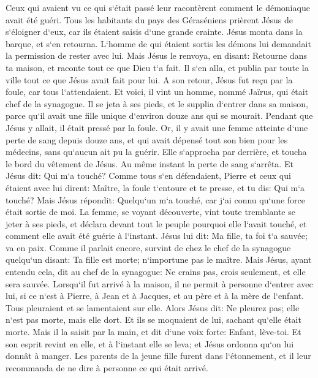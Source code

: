 \verse Ceux qui avaient vu ce qui s`était passé leur racontèrent comment le démoniaque avait été guéri. 
\verse Tous les habitants du pays des Géraséniens prièrent Jésus de s`éloigner d`eux, car ils étaient saisis d`une grande crainte. Jésus monta dans la barque, et s`en retourna. 
\verse L`homme de qui étaient sortis les démons lui demandait la permission de rester avec lui. Mais Jésus le renvoya, en disant: 
\verse Retourne dans ta maison, et raconte tout ce que Dieu t`a fait. Il s`en alla, et publia par toute la ville tout ce que Jésus avait fait pour lui. 
\verse A son retour, Jésus fut reçu par la foule, car tous l`attendaient. 
\verse Et voici, il vint un homme, nommé Jaïrus, qui était chef de la synagogue. Il se jeta à ses pieds, et le supplia d`entrer dans sa maison, 
\verse parce qu`il avait une fille unique d`environ douze ans qui se mourait. Pendant que Jésus y allait, il était pressé par la foule. 
\verse Or, il y avait une femme atteinte d`une perte de sang depuis douze ans, et qui avait dépensé tout son bien pour les médecins, sans qu`aucun ait pu la guérir. 
\verse Elle s`approcha par derrière, et toucha le bord du vêtement de Jésus. Au même instant la perte de sang s`arrêta. 
\verse Et Jésus dit: Qui m`a touché? Comme tous s`en défendaient, Pierre et ceux qui étaient avec lui dirent: Maître, la foule t`entoure et te presse, et tu dis: Qui m`a touché? 
\verse Mais Jésus répondit: Quelqu`un m`a touché, car j`ai connu qu`une force était sortie de moi. 
\verse La femme, se voyant découverte, vint toute tremblante se jeter à ses pieds, et déclara devant tout le peuple pourquoi elle l`avait touché, et comment elle avait été guérie à l`instant. 
\verse Jésus lui dit: Ma fille, ta foi t`a sauvée; va en paix. 
\verse Comme il parlait encore, survint de chez le chef de la synagogue quelqu`un disant: Ta fille est morte; n`importune pas le maître. 
\verse Mais Jésus, ayant entendu cela, dit au chef de la synagogue: Ne crains pas, crois seulement, et elle sera sauvée. 
\verse Lorsqu`il fut arrivé à la maison, il ne permit à personne d`entrer avec lui, si ce n`est à Pierre, à Jean et à Jacques, et au père et à la mère de l`enfant. 
\verse Tous pleuraient et se lamentaient sur elle. Alors Jésus dit: Ne pleurez pas; elle n`est pas morte, mais elle dort. 
\verse Et ils se moquaient de lui, sachant qu`elle était morte. 
\verse Mais il la saisit par la main, et dit d`une voix forte: Enfant, lève-toi. 
\verse Et son esprit revint en elle, et à l`instant elle se leva; et Jésus ordonna qu`on lui donnât à manger. 
\verse Les parents de la jeune fille furent dans l`étonnement, et il leur recommanda de ne dire à personne ce qui était arrivé. 

